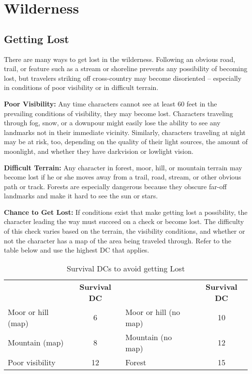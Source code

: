 \section{Wilderness}

\subsection{Getting Lost}

There are many ways to get lost in the wilderness. Following an obvious road, trail, 
or feature such as a stream or shoreline prevents any possibility of becoming lost, 
but travelers striking off cross-country may become disoriented -- especially in 
conditions of poor visibility or in difficult terrain. 

\textbf{Poor Visibility:} Any time characters cannot see at least 60 feet in the 
prevailing conditions of visibility, they may become lost. Characters traveling 
through fog, snow, or a downpour might easily lose the ability to see any landmarks 
not in their immediate vicinity. Similarly, characters traveling at night may be 
at risk, too, depending on the quality of their light sources, the amount of moonlight, 
and whether they have darkvision or lowlight vision.

\textbf{Difficult Terrain:} Any character in forest, moor, hill, or mountain terrain 
may become lost if he or she moves away from a trail, road, stream, or other obvious 
path or track. Forests are especially dangerous because they obscure far-off landmarks 
and make it hard to see the sun or stars.

\textbf{Chance to Get Lost:} If conditions exist that make getting lost a possibility, 
the character leading the way must succeed on a  check or become lost. 
The difficulty of this check varies based on the terrain, the visibility conditions, 
and whether or not the character has a map of the area being traveled through. 
Refer to the table below and use the highest DC that applies.

\begin{table}[htb]
\caption{Survival DCs to avoid getting Lost}
\centering
\begin{tabular}{l c l c}
 & \textbf{Survival DC} & & \textbf{Survival DC}\\
Moor or hill (map) & 6 & Moor or hill (no map) & 10\\
Mountain (map) & 8 & Mountain (no map) & 12\\
Poor visibility & 12 & Forest & 15\\
\end{tabular}
\end{table}

